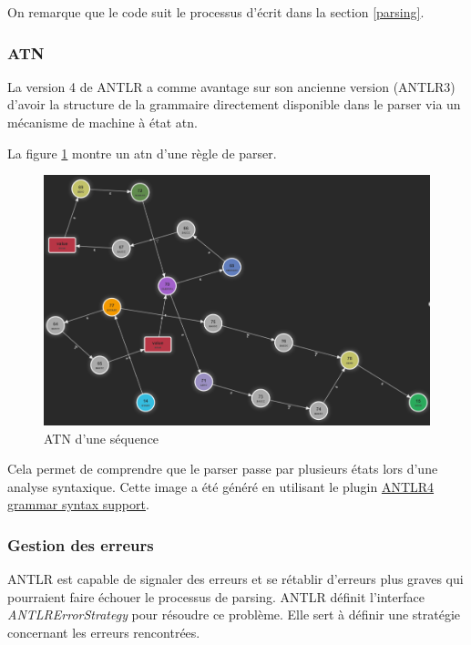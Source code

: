 \documentclass[
    iict, %
    il, %
]{heig-tb}
\begin{document}
On remarque que le code suit le processus d'écrit dans la section \ref{parsing}.

\subsubsection{ATN}

La version 4 de ANTLR a comme avantage sur son ancienne version (ANTLR3) d'avoir la structure de la grammaire directement disponible dans le parser via
un mécanisme de machine à état \Gls{atn}.

La figure \ref{ATN d'une séquence} montre un atn d'une règle de parser.

\begin{figure}[!ht]
    \begin{center}
        \includegraphics[width=12cm]{assets/figures/seq_ATN.png}
    \end{center}
    \caption[ATN d'une séquence]{\label{ATN d'une séquence} ATN d'une séquence}
\end{figure}

Cela permet de comprendre que le parser passe par plusieurs états lors d'une analyse syntaxique.
Cette image a été généré en utilisant le plugin \href{https://marketplace.visualstudio.com/items?itemName=mike-lischke.vscode-antlr4}{ANTLR4 grammar syntax support}.

\subsubsection{Gestion des erreurs}

ANTLR est capable de signaler des erreurs et se rétablir d'erreurs plus graves qui pourraient faire échouer le processus de parsing.
ANTLR définit l'interface \emph{ANTLRErrorStrategy} pour résoudre ce problème.
Elle sert à définir une stratégie concernant les erreurs rencontrées.
\end{document}
